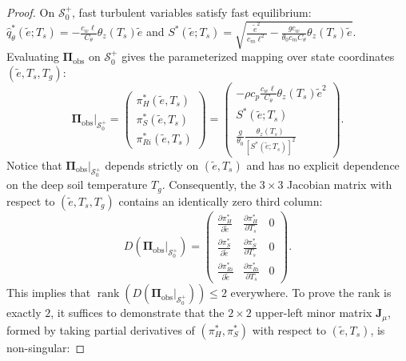 \begin{proof}
On $\mathcal{S}_0^+$, fast turbulent variables satisfy fast equilibrium: $\hat q_\theta^*(\tilde e; T_s) = -\frac{c_w \ell}{C_\theta}\theta_z(T_s)\tilde e$ and $S^*(\tilde e; T_s) = \sqrt{\frac{\tilde e^2}{c_m \ell^2} - \frac{g c_w}{\theta_0 c_m C_\theta}\theta_z(T_s)\tilde e}$.
Evaluating $\boldsymbol{\Pi}_{\mathrm{obs}}$ on $\mathcal{S}_0^+$ gives the parameterized mapping over state coordinates $(\tilde e, T_s, T_g)$:
\begin{equation}
\left.\boldsymbol{\Pi}_{\mathrm{obs}}\right|_{\mathcal{S}_0^+} =
\begin{pmatrix}
\pi_H^*(\tilde e, T_s) \\[4pt]
\pi_S^*(\tilde e, T_s) \\[4pt]
\pi_{Ri}^*(\tilde e, T_s)
\end{pmatrix}
=
\begin{pmatrix}
-\rho c_p \frac{c_w \ell}{C_\theta} \theta_z(T_s) \tilde e^2 \\[6pt]
S^*(\tilde e; T_s) \\[6pt]
\frac{g}{\theta_0} \frac{\theta_z(T_s)}{\left[S^*(\tilde e; T_s)\right]^2}
\end{pmatrix}.
\end{equation}
Notice that $\boldsymbol{\Pi}_{\mathrm{obs}}\vert_{\mathcal{S}_0^+}$ depends strictly on $(\tilde e, T_s)$ and has no explicit dependence on the deep soil temperature $T_g$. Consequently, the $3 \times 3$ Jacobian matrix with respect to $(\tilde e, T_s, T_g)$ contains an identically zero third column:
\begin{equation}
D\left(\left.\boldsymbol{\Pi}_{\mathrm{obs}}\right|_{\mathcal{S}_0^+}\right) =
\begin{pmatrix}
\frac{\partial \pi_H^*}{\partial \tilde e} & \frac{\partial \pi_H^*}{\partial T_s} & 0 \\[6pt]
\frac{\partial \pi_S^*}{\partial \tilde e} & \frac{\partial \pi_S^*}{\partial T_s} & 0 \\[6pt]
\frac{\partial \pi_{Ri}^*}{\partial \tilde e} & \frac{\partial \pi_{Ri}^*}{\partial T_s} & 0
\end{pmatrix}.
\end{equation}
This implies that $\operatorname{rank}\left(D\left(\boldsymbol{\Pi}_{\mathrm{obs}}\vert_{\mathcal{S}_0^+}\right)\right) \le 2$ everywhere. To prove the rank is exactly $2$, it suffices to demonstrate that the $2 \times 2$ upper-left minor matrix $\mathbf{J}_{\mu}$, formed by taking partial derivatives of $(\pi_H^*, \pi_S^*)$ with respect to $(\tilde e, T_s)$, is non-singular:

\end{proof}
